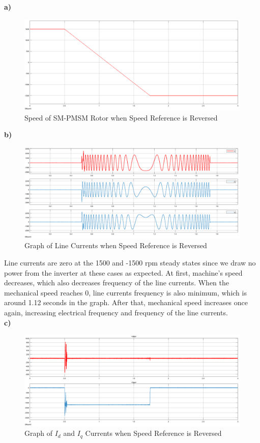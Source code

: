\documentclass{article}
\begin{document}
\textbf{a)}
\begin{figure}[H]
    \centering
    \includegraphics[scale=0.2]{q3_speed.png}
    \caption{Speed of SM-PMSM Rotor when Speed Reference is Reversed}
    \label{fig:my_label}
\end{figure}
\newpage
\textbf{b)}
\begin{figure}[H]
    \centering
    \includegraphics[scale=0.2]{q3_line currents.png}
    \caption{Graph of Line Currents when Speed Reference is Reversed}
    \label{fig:my_label}
\end{figure}
Line currents are zero at the 1500 and -1500 rpm steady states since we draw no power from the inverter at these cases as expected. At first, machine's speed decreases, which also decreases frequency of the line currents. When the mechanical speed reaches 0, line currents frequency is also minimum, which is around 1.12 seconds in the graph. After that, mechanical speed increases once again, increasing electrical frequency and frequency of the line currents.  \\
\textbf{c)}
\begin{figure}[H]
    \centering
    \includegraphics[scale=0.2]{q3_dq.png}
    \caption{Graph of $I_d$ and $I_q$ Currents when Speed Reference is Reversed}
    \label{fig:my_label}
\end{figure}
\end{document}
